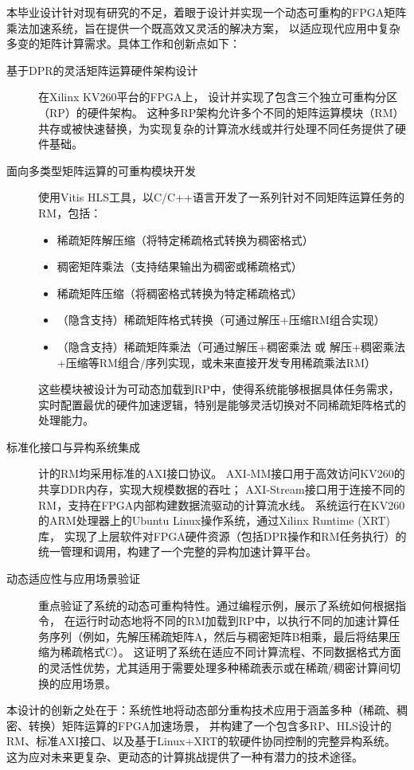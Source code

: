 本毕业设计针对现有研究的不足，着眼于设计并实现一个动态可重构的FPGA矩阵乘法加速系统，旨在提供一个既高效又灵活的解决方案，
以适应现代应用中复杂多变的矩阵计算需求。具体工作和创新点如下：
\begin{description}
\item[基于DPR的灵活矩阵运算硬件架构设计] 在Xilinx KV260平台的FPGA上，
  设计并实现了包含三个独立可重构分区（RP）的硬件架构。
  这种多RP架构允许多个不同的矩阵运算模块（RM）共存或被快速替换，为实现复杂的计算流水线或并行处理不同任务提供了硬件基础。
\item[面向多类型矩阵运算的可重构模块开发] 使用Vitis HLS工具，以C/C++语言开发了一系列针对不同矩阵运算任务的RM，包括：
\begin{itemize}
  \item 稀疏矩阵解压缩（将特定稀疏格式转换为稠密格式）
  \item 稠密矩阵乘法（支持结果输出为稠密或稀疏格式）
  \item 稀疏矩阵压缩（将稠密格式转换为特定稀疏格式）
  \item （隐含支持）稀疏矩阵格式转换（可通过解压+压缩RM组合实现）
  \item （隐含支持）稀疏矩阵乘法（可通过解压+稠密乘法 或 解压+稠密乘法+压缩等RM组合/序列实现，或未来直接开发专用稀疏乘法RM）
\end{itemize}
这些模块被设计为可动态加载到RP中，使得系统能够根据具体任务需求，实时配置最优的硬件加速逻辑，特别是能够灵活切换对不同稀疏矩阵格式的处理能力。
\item[标准化接口与异构系统集成] 计的RM均采用标准的AXI接口协议。
AXI-MM接口用于高效访问KV260的共享DDR内存，实现大规模数据的吞吐；
AXI-Stream接口用于连接不同的RM，支持在FPGA内部构建数据流驱动的计算流水线。
系统运行在KV260的ARM处理器上的Ubuntu Linux操作系统，通过Xilinx Runtime (XRT)库，
实现了上层软件对FPGA硬件资源（包括DPR操作和RM任务执行）的统一管理和调用，构建了一个完整的异构加速计算平台。
\item[动态适应性与应用场景验证] 重点验证了系统的动态可重构特性。通过编程示例，展示了系统如何根据指令，
在运行时动态地将不同的RM加载到RP中，以执行不同的加速计算任务序列（例如，先解压稀疏矩阵A，然后与稠密矩阵B相乘，最后将结果压缩为稀疏格式C）。
这证明了系统在适应不同计算流程、不同数据格式方面的灵活性优势，尤其适用于需要处理多种稀疏表示或在稀疏/稠密计算间切换的应用场景。
\end{description}

本设计的创新之处在于：系统性地将动态部分重构技术应用于涵盖多种（稀疏、稠密、转换）矩阵运算的FPGA加速场景，
并构建了一个包含多RP、HLS设计的RM、标准AXI接口、以及基于Linux+XRT的软硬件协同控制的完整异构系统。
这为应对未来更复杂、更动态的计算挑战提供了一种有潜力的技术途径。

